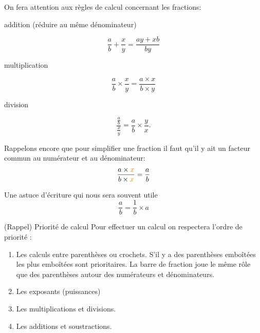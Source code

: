 \documentclass[10pt,a4paper,openany,twoside,prof]{book}
\begin{document}
\begin{rem}{}{}

On fera attention aux règles de calcul concernant les fractions:


\begin{minipage}{7cm}
\begin{center}
 addition (réduire au même dénominateur)
\end{center} \[  \frac{a}{b}+\frac{x}{y}=\frac{ay+xb}{by} \] \end{minipage}
\vline
\begin{minipage}{5cm}
\begin{center}
 multiplication
 \end{center} \[  \frac{a}{b}\times \frac{x}{y}=\frac{a \times x}{b \times y} \]
\end{minipage}
\vline
\begin{minipage}{4cm}
\begin{center}
division
\end{center}\[  \frac{ \frac{a}{b} }{ \frac{x}{y}}=\frac{a}{b}\times \frac{y}{x}. \]
\end{minipage}

\medskip
Rappelons encore que pour simplifier une fraction il faut qu'il y ait un facteur \\commun au numérateur et au dénominateur: \[  \frac{a\times {\color{orange}x}}{b\times {\color{orange}x}}=\frac{a}{b} \]

\medskip
Une astuce d'écriture qui nous sera souvent utile \[ \frac{a}{b}=\frac{1}{b}\times a \]
\end{rem}

\begin{prop}{(Rappel) Priorité de calcul}{}
 Pour effectuer un calcul on respectera l'ordre de priorité :
\begin{enumerate}
\item Les calculs entre parenthèses ou crochets. S'il y a des parenthèses emboîtées les plus emboîtées sont prioritaires. La barre de fraction joue le même rôle que des parenthèses autour des numérateurs et dénominateurs.
\item Les exposants (puissances)
\item Les multiplications et divisions.
\item Les additions et soustractions.
\end{enumerate}
\end{prop}

\end{document}
